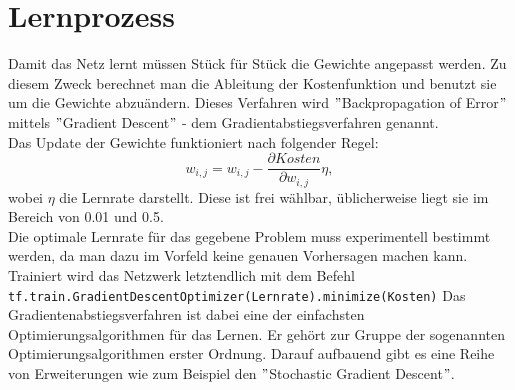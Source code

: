 \section{Lernprozess}
Damit das Netz lernt müssen Stück für Stück die Gewichte angepasst werden. Zu diesem Zweck berechnet man die Ableitung der Kostenfunktion und benutzt sie um die Gewichte abzuändern. Dieses Verfahren wird $"$Backpropagation of Error$"$ mittels $"$Gradient Descent$"$ - dem Gradientabstiegsverfahren genannt.\\
Das Update der Gewichte funktioniert nach folgender Regel:\cite{Rojas1996}
\begin{equation}
w_{i,j}=w_{i,j}-\frac{\partial Kosten }{\partial w_{i,j}}\eta,
\end{equation}
wobei $\eta$ die Lernrate darstellt. Diese ist frei wählbar, üblicherweise liegt sie im Bereich von 0.01 und 0.5.\\
Die optimale Lernrate für das gegebene Problem muss experimentell bestimmt werden, da man dazu im Vorfeld keine genauen Vorhersagen machen kann.
Trainiert wird das Netzwerk letztendlich mit dem Befehl \lstinline$tf.train.GradientDescentOptimizer(Lernrate).minimize(Kosten)$\cite{building}
Das Gradientenabstiegsverfahren ist dabei eine der einfachsten Optimierungsalgorithmen für das Lernen. Er gehört zur Gruppe der sogenannten Optimierungsalgorithmen erster Ordnung.\cite{Goodfellow} Darauf aufbauend gibt es eine Reihe von Erweiterungen wie zum Beispiel den $"$Stochastic Gradient Descent$"$.\cite{Goodfellow}